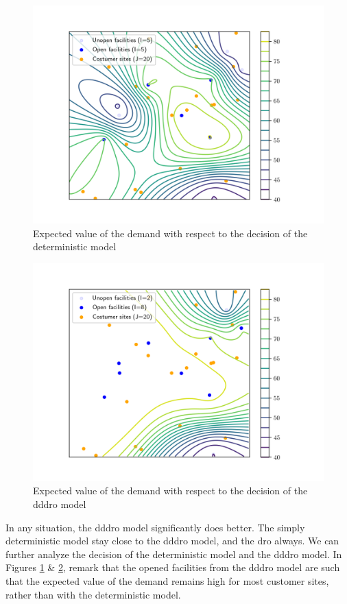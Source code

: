 \documentclass[12pt, letterpaper]{article}
\begin{document}
	\begin{figure}
		\centering
		\includegraphics*[width=\textwidth]{../figure/report_expected_open_fac_deterministic.png}
		\caption{Expected value of the demand with respect to the decision of the deterministic model}
		\label{fig:expected_deterministic}
	\end{figure}
	\begin{figure}
		\centering
		\includegraphics*[width=\textwidth]{../figure/report_expected_open_fac_ddro.png}
		\caption{Expected value of the demand with respect to the decision of the \gls{dddro} model}
		\label{fig:expected_dddro}
	\end{figure}

	In any situation, the \gls{dddro} model significantly does better. The simply deterministic model stay close to the \gls{dddro} model, and the \gls{dro} always. We can further analyze the decision of the deterministic model and the \gls{dddro} model. In Figures \ref{fig:expected_deterministic} \& \ref{fig:expected_dddro}, remark that the opened facilities from the \gls{dddro} model are such that the expected value of the demand remains high for most customer sites, rather than with the deterministic model.

	\clearpage
	\printglossary[type=\acronymtype]
	
	\clearpage
	
	
\end{document}
